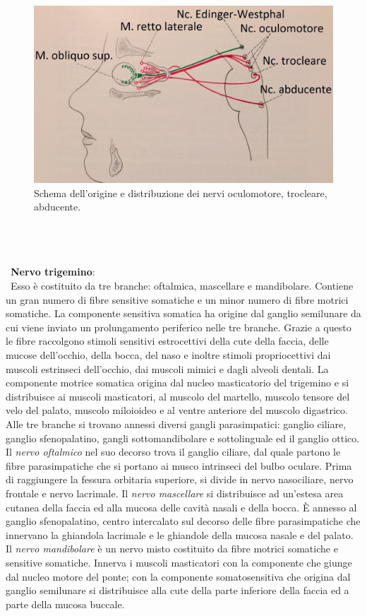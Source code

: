 \begin{figure}[h!]
	\centering
	\includegraphics[scale=0.15]{source/immagini/nervo_abducente.jpg}
	\caption[figure]{Schema dell'origine e distribuzione dei nervi oculomotore, trocleare, abducente.}
	\label{fig:issuexample}
\end{figure}
\\\ \\\ \\\
\textbf{Nervo trigemino}: 
\\\ Esso è costituito da tre branche: oftalmica, mascellare e mandibolare. Contiene un gran numero di fibre sensitive somatiche e un minor numero di fibre motrici somatiche. La componente sensitiva somatica ha origine dal ganglio semilunare da cui viene inviato un prolungamento periferico nelle tre branche. Grazie a questo le fibre raccolgono stimoli sensitivi estrocettivi della cute della faccia, delle mucose dell’occhio, della bocca, del naso e inoltre stimoli propriocettivi dai muscoli estrinseci dell’occhio, dai muscoli mimici e dagli alveoli dentali. La componente motrice somatica origina dal nucleo masticatorio del trigemino e si distribuisce ai muscoli masticatori, al muscolo del martello, muscolo tensore del velo del palato, muscolo miloioideo e al ventre anteriore del muscolo digastrico. 
Alle tre branche si trovano annessi diversi gangli parasimpatici: ganglio ciliare, ganglio sfenopalatino, gangli sottomandibolare e sottolinguale ed il ganglio ottico. 
Il \emph{nervo oftalmico} nel suo decorso trova il ganglio ciliare, dal quale partono le fibre parasimpatiche che si portano ai musco intrinseci del bulbo oculare. Prima di raggiungere la fessura orbitaria superiore, si divide in nervo nasociliare, nervo frontale e nervo lacrimale.
Il \emph{nervo mascellare} si distribuisce ad un’estesa area cutanea della faccia ed alla mucosa delle cavità nasali e della bocca. È annesso al ganglio sfenopalatino, centro intercalato sul decorso delle fibre parasimpatiche che innervano la ghiandola lacrimale e le ghiandole della mucosa nasale e del palato.
Il \emph{nervo mandibolare} è un nervo misto costituito da fibre motrici somatiche e sensitive somatiche. Innerva i muscoli masticatori con la componente che giunge dal nucleo motore del ponte; con la componente somatosensitiva che origina dal ganglio semilunare si distribuisce alla cute della parte inferiore della faccia ed a parte della mucosa buccale. 

